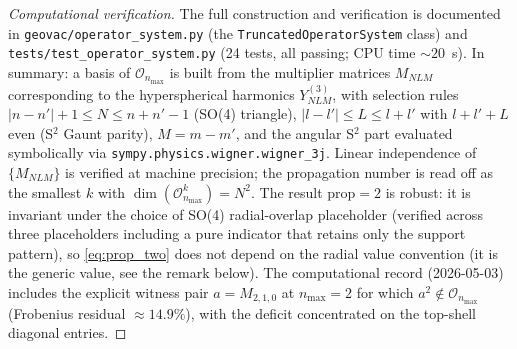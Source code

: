 \documentclass[11pt]{article}
\begin{document}
\begin{proof}[Computational verification]
The full construction and verification is documented in
\texttt{geovac/operator\_system.py} (the \texttt{TruncatedOperatorSystem}
class) and \texttt{tests/test\_operator\_system.py} (24 tests, all
passing; CPU time ${\sim}20$~s).  In summary: a basis of
$\mathcal{O}_{n_{\max}}$ is built from the multiplier matrices
$M_{NLM}$ corresponding to the hyperspherical harmonics
$Y^{(3)}_{NLM}$, with selection rules $|n - n'| + 1 \le N \le n + n' -
1$ (SO(4) triangle), $|l - l'| \le L \le l + l'$ with $l + l' + L$
even (S$^2$ Gaunt parity), $M = m - m'$, and the angular S$^2$ part
evaluated symbolically via \texttt{sympy.physics.wigner.wigner\_3j}.
Linear independence of $\{M_{NLM}\}$ is verified at machine precision;
the propagation number is read off as the smallest $k$ with
$\dim(\mathcal{O}_{n_{\max}}^k) = N^2$.  The result
$\mathrm{prop} = 2$ is robust: it is invariant under the choice of
SO(4) radial-overlap placeholder (verified across three placeholders
including a pure indicator that retains only the support pattern), so
\eqref{eq:prop_two} does not depend on the radial value
convention (it is the generic value, see the remark below).  The computational record (2026-05-03) includes the explicit witness pair $a = M_{2,1,0}$ at $n_{\max} = 2$ for which $a^2 \notin
\mathcal{O}_{n_{\max}}$ (Frobenius residual $\approx 14.9\%$), with
the deficit concentrated on the top-shell diagonal entries.
\end{proof}
\end{document}
